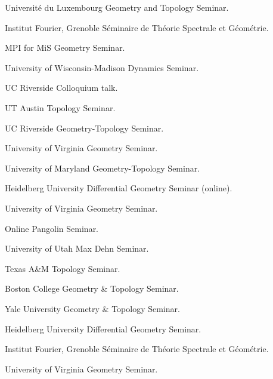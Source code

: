 {Universit\'e du Luxembourg}
{Geometry and Topology Seminar.}
{}

{Institut Fourier, Grenoble}
{S\'eminaire de Th\'eorie Spectrale et G\'eom\'etrie.}
{}

{MPI for MiS}
{Geometry Seminar.}
{}

{University of Wisconsin-Madison}
{Dynamics Seminar.}
{}

{UC Riverside}
{Colloquium talk.}
{}

{UT Austin}
{Topology Seminar.}
{}

{UC Riverside}
{Geometry-Topology Seminar.}
{}

{University of Virginia}
{Geometry Seminar.}
{}

{University of Maryland}
{Geometry-Topology Seminar.}
{}

{Heidelberg University}
{Differential Geometry Seminar (online).}
{}

{University of Virginia}
{Geometry Seminar.}
{}

{Online}
{Pangolin Seminar.}
{}

{University of Utah}
{Max Dehn Seminar.}
{}

{Texas A\&M}
{Topology Seminar.}
{}

{Boston College}
{Geometry \& Topology Seminar.}
{}

{Yale University}
{Geometry \& Topology Seminar.}
{}

{Heidelberg University}
{Differential Geometry Seminar.}
{}

{Institut Fourier, Grenoble}
{S\'eminaire de Th\'eorie Spectrale et G\'eom\'etrie.}
{}

{University of Virginia}
{Geometry Seminar.}
{}


